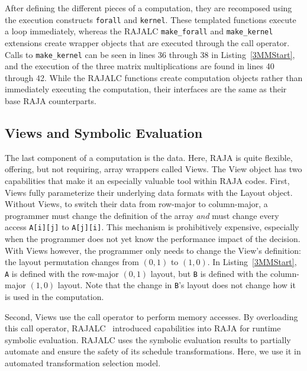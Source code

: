 After defining the different pieces of a computation, they are recomposed using the execution constructs \verb.forall. and \verb.kernel..
These templated functions execute a loop immediately, whereas the RAJALC \verb.make_forall. and \verb.make_kernel. extensions create wrapper objects that are executed through the call operator. 
Calls to \verb.make_kernel. can be seen in lines 36 through 38 in Listing~\ref{3MMStart}, and the execution of the three matrix multiplications are found in lines 40 through 42. 
While the RAJALC functions create computation objects rather than immediately executing the computation, their interfaces are the same as their base RAJA counterparts.

\subsection{Views and Symbolic Evaluation}

The last component of a computation is the data.
Here, RAJA is quite flexible, offering, but not requiring, array wrappers called Views.
The View object has two capabilities that make it an especially valuable tool within RAJA codes.
First, Views fully parameterize their underlying data formats with the Layout object.
Without Views, to switch their data from row-major to column-major, a programmer must change the definition of the array \textit{and} must change every access \verb.A[i][j]. to \verb.A[j][i]..
This mechanism is prohibitively expensive, especially when the programmer does not yet know the performance impact of the decision.
With Views however, the programmer only needs to change the View's definition: the layout permutation changes from $(0,1)$ to $(1,0)$. 
In Listing~\ref{3MMStart}, \verb.A. is defined with the row-major $(0,1)$ layout, but \verb.B. is defined with the column-major $(1,0)$ layout. 
Note that the change in \verb.B.'s layout does not change how it is used in the computation. 

Second, Views use the call operator to perform memory accesses. 
By overloading this call operator, RAJALC~\cite{neth2021inter} introduced capabilities into RAJA for runtime symbolic evaluation.
RAJALC uses the symbolic evaluation results to partially automate and ensure the safety of its schedule transformations.
Here, we use it in automated transformation selection model.

